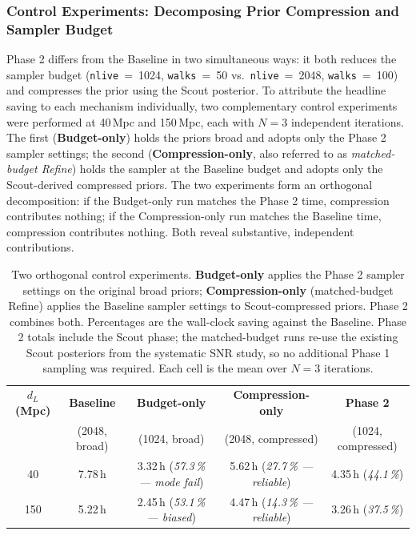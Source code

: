 \documentclass[12pt]{article}
\begin{document}
\subsubsection{Control Experiments: Decomposing Prior Compression and Sampler Budget}
\label{sec:control}
Phase 2 differs from the Baseline in two simultaneous ways: it both reduces the sampler budget (\texttt{nlive}~=~1024, \texttt{walks}~=~50 vs.\ \texttt{nlive}~=~2048, \texttt{walks}~=~100) and compresses the prior using the Scout posterior. To attribute the headline saving to each mechanism individually, two complementary control experiments were performed at 40\,Mpc and 150\,Mpc, each with $N=3$ independent iterations. The first (\textbf{Budget-only}) holds the priors broad and adopts only the Phase 2 sampler settings; the second (\textbf{Compression-only}, also referred to as \emph{matched-budget Refine}) holds the sampler at the Baseline budget and adopts only the Scout-derived compressed priors. The two experiments form an orthogonal decomposition: if the Budget-only run matches the Phase 2 time, compression contributes nothing; if the Compression-only run matches the Baseline time, compression contributes nothing. Both reveal substantive, independent contributions.
 
\begin{table}[htbp]
    \centering
    \small
    \begin{tabular}{c c c c c}
        \hline\hline
        \textbf{$d_L$ (Mpc)} & \textbf{Baseline} & \textbf{Budget-only} & \textbf{Compression-only} & \textbf{Phase 2} \\
                            & (2048, broad)     & (1024, broad)        & (2048, compressed)        & (1024, compressed) \\
        \hline
        40  & 7.78\,h & 3.32\,h\,\,(\textit{57.3\,\% --- mode fail}) & 5.62\,h\,\,(\textit{27.7\,\% --- reliable}) & 4.35\,h\,\,(\textit{44.1\,\%}) \\
        150 & 5.22\,h & 2.45\,h\,\,(\textit{53.1\,\% --- biased})    & 4.47\,h\,\,(\textit{14.3\,\% --- reliable}) & 3.26\,h\,\,(\textit{37.5\,\%}) \\
        \hline\hline
    \end{tabular}
    \caption[Budget-only vs.\ compression-only controls.]{Two orthogonal control experiments. \textbf{Budget-only} applies the Phase 2 sampler settings on the original broad priors; \textbf{Compression-only} (matched-budget Refine) applies the Baseline sampler settings to Scout-compressed priors. Phase 2 combines both. Percentages are the wall-clock saving against the Baseline. Phase 2 totals include the Scout phase; the matched-budget runs re-use the existing Scout posteriors from the systematic SNR study, so no additional Phase 1 sampling was required. Each cell is the mean over $N=3$ iterations.}
    \label{tab:control_experiment}
\end{table}
 
\end{document}
